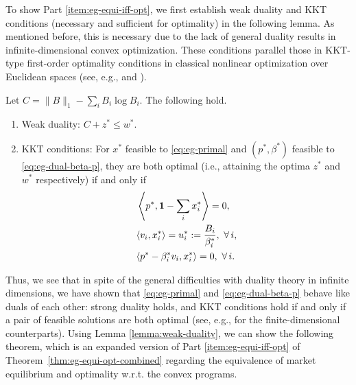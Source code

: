 To show Part \ref{item:eg-equi-iff-opt}, we first establish weak duality and KKT conditions (necessary and sufficient for optimality) in the following lemma. 
As mentioned before, this is necessary due to the lack of general duality results in infinite-dimensional convex optimization.
These conditions parallel those in KKT-type first-order optimality conditions in classical nonlinear optimization over Euclidean spaces (see, e.g., \citet[\S 12.3]{nocedal2006numerical} and \citet[\S 3.3.1]{bertsekas1999nonlinear}).
\begin{lemma}
	Let $C = \|B\|_1 - \sum_i B_i \log B_i$. The following hold.
	\begin{enumerate}[label=(\alph*)]
		\item Weak duality: $C + z^* \leq w^*$. \label{item:eg-weak-duality}
		\item KKT conditions: For $x^*$ feasible to \eqref{eq:eg-primal} and $(p^*, \beta^*)$ feasible to \eqref{eq:eg-dual-beta-p}, they are both optimal (i.e., attaining the optima $z^*$ and $w^*$ respectively) if and only if
		\begin{align}
			& \left \langle p^*, \ones - \sum_i x^*_i\right \rangle = 0, \label{eq:mkt-clear} \\
			& \langle v_i, x_i^*\rangle = u^*_i :=  \frac{B_i}{\beta^*_i}, \ \forall\, i,	\label{eq:u*=B/beta*} \\
			& \langle p^* - \beta^*_i v_i, x^*_i \rangle = 0,\ \forall\, i. \label{eq:comp-slack-dual}
		\end{align} \label{item:eg-KKT-iff}
	\end{enumerate} \label{lemma:weak-duality}
\end{lemma}
Thus, we see that in spite of the general difficulties with duality theory in infinite dimensions, we have shown that \eqref{eq:eg-primal} and \eqref{eq:eg-dual-beta-p} behave like duals of each other: strong duality holds, and KKT conditions hold if and only if a pair of feasible solutions are both optimal (see, e.g., \citet[\S 5.2]{nisan2007algorithmic} for the finite-dimensional counterparts). 
Using Lemma \ref{lemma:weak-duality}, we can show the following theorem, which is an expanded version of Part \ref{item:eg-equi-iff-opt} of Theorem~\ref{thm:eg-equi-opt-combined} regarding the equivalence of market equilibrium and optimality w.r.t. the convex programs.
